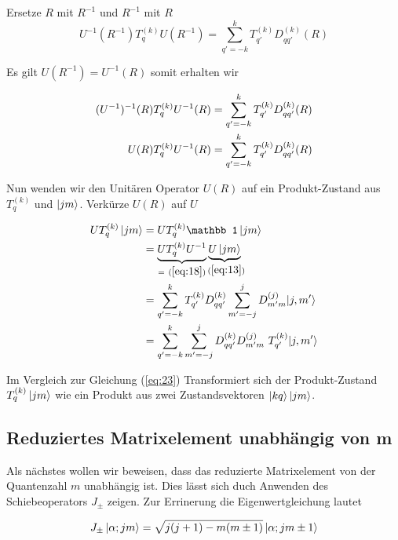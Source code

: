Ersetze \(R\) mit \(R^{-1}\) und \(R^{-1}\) mit \(R\)
\begin{equation}
  \label{eq:17}
  U^{-1}(R^{-1}) T^{(k)}_q U(R^{-1}) = \sum_{q'=-k}^{k}T^{(k)}_{q'} D^{(k)}_{qq'}(R)
\end{equation}

Es gilt \(U(R^{-1})=U^{-1}(R)\) somit erhalten wir

\begin{align}
  \label{eq:18}
  (U^{-1})^{-1}(R) T^{(k)}_q U^{-1}(R) &= \sum_{q'=-k}^{k}T^{(k)}_{q'} D^{(k)}_{qq'}(R) \notag\\
U(R) T^{(k)}_q U^{-1}(R) &= \sum_{q'=-k}^{k}T^{(k)}_{q'} D^{(k)}_{qq'}(R)
\end{align}

Nun wenden wir den Unitären Operator \(U(R)\) auf ein Produkt-Zustand aus \(T^{(k)}_q\) und \(\left| jm \right\rangle\). Verkürze \(U(R)\) auf \(U\)

\begin{align}
  \label{eq:19}
  U T^{(k)}_q\ket{jm} &= U T^{(k)}_q\mathbb 1 \ket{jm} \notag\\
&=\underbr{ U T^{(k)}_q U^{-1}}_{=~(\ref{eq:18})} \underbr{ U \ket{jm}}_{~(\ref{eq:13})}\notag \\
&= \sum_{q'=-k}^{k}T^{(k)}_{q'} D^{(k)}_{qq'} \sum_{m'=-j}^j D^{(j)}_{m'm} |j,m'\rangle \notag \\
&= \sum_{q'=-k}^{k}\sum_{m'=-j}^j D^{(k)}_{qq'}  D^{(j)}_{m'm}\,\, T^{(k)}_{q'} |j,m'\rangle  
\end{align}

Im Vergleich zur Gleichung (\ref{eq:23}) Transformiert sich der Produkt-Zustand \( T^{(k)}_q\left| jm \right\rangle\) wie ein Produkt aus zwei Zustandsvektoren \(\left| kq \right\rangle\left| jm \right\rangle\). 



\subsection*{Reduziertes Matrixelement unabhängig von m}
\label{sec:2}

Als nächstes wollen wir beweisen, dass das reduzierte Matrixelement von der Quantenzahl \(m\) unabhängig ist. Dies lässt sich duch Anwenden des Schiebeoperators \(J_{\pm}\) zeigen. Zur Errinerung die Eigenwertgleichung lautet

\begin{equation}
  \label{eq:11}
  J_{\pm}\left| \alpha; jm \right\rangle = \sqrt{j(j+1)-m(m\pm 1)} \left| \alpha; jm\pm 1 \right\rangle
\end{equation}


